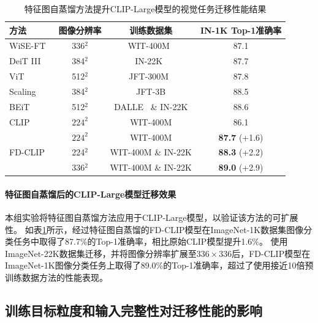 \begin{table}
\caption{
特征图自蒸馏方法提升CLIP-Large模型的视觉任务迁移性能结果
}
\centering
  \begin{tabular}{lccc}
\toprule
 方法 & 图像分辨率 & 训练数据集 & IN-1K Top-1准确率 \\
  \midrule
    WiSE-FT~\cite{ftclip2021} & 336$^2$ & WIT-400M~\cite{radford2021learning} & 87.1 \\
    DeiT III~\cite{touvron2022deit} & 384$^2$ & IN-22K~\cite{deng2009imagenet} & 87.7 \\
    ViT~\cite{dosovitskiy2020vit} & 512$^2$ & JFT-300M~\cite{Sun_2017_JFT300m} & 87.8 \\
   Scaling~\cite{zhai2022scaling} &  384$^2$ &  JFT-3B\cite{zhai2022scaling} &  88.5 \\
   BEiT~\cite{bao2021beit} &  512$^2$ &  DALLE~\cite{ramesh2021dalle1} \& IN-22K &  88.6 \\

  \midrule
  CLIP & $224^2$ & WIT-400M & 86.1 \\
  \midrule
  \multirow{3}{*}{FD-CLIP} & $224^2$ & WIT-400M & \textbf{87.7}\scriptsize{ (+1.6)} \\
   & 224$^2$ & WIT-400M \& IN-22K & \textbf{88.3}\scriptsize{ (+2.2)} \\
   & 336$^2$ & WIT-400M \& IN-22K & \textbf{89.0}\scriptsize{ (+2.9)} \\
\bottomrule
  \end{tabular}
\label{tab:fd-clip_large_FD}
\end{table}

\paragraph{特征图自蒸馏后的CLIP-Large模型迁移效果} 本组实验将特征图自蒸馏方法应用于CLIP-Large模型，以验证该方法的可扩展性。
如表\ref{tab:fd-clip_large_FD}所示，经过特征图自蒸馏的FD-CLIP模型在ImageNet-1K数据集图像分类任务中取得了87.7\%的Top-1准确率，相比原始CLIP模型提升1.6\%。
使用ImageNet-22K数据集迁移，并将图像分辨率扩展至$336\times 336$后，FD-CLIP模型在ImageNet-1K图像分类任务上取得了89.0\%的Top-1准确率，超过了使用接近10倍预训练数据方法\cite{zhai2022scaling}的性能表现。%

\subsection{训练目标粒度和输入完整性对迁移性能的影响}
\label{sec:fd-exp-input}

